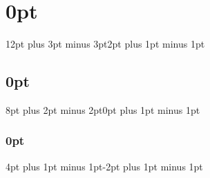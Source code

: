 \ifneosanspro
	\def\UrlFont{\NeoSansProReg}
\fi




\newsavebox\mybox
\savebox{}

%



\makeatletter %
\makeatother  

\titlespacing\section{0pt}{12pt plus 3pt minus 3pt}{2pt plus 1pt minus 1pt}
\titlespacing\subsection{0pt}{8pt plus 2pt minus 2pt}{0pt plus 1pt minus 1pt}
\titlespacing\subsubsection{0pt}{4pt plus 1pt minus 1pt}{-2pt plus 1pt minus 1pt}
\captionsetup{belowskip=\parskip,aboveskip=4pt plus 1pt minus 1pt}



